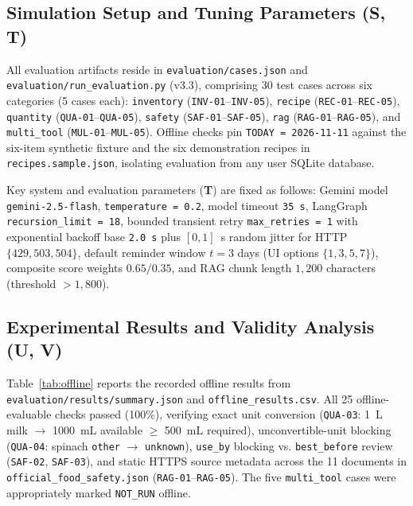 \documentclass[conference]{IEEEtran}
\begin{document}
\subsection{Simulation Setup and Tuning Parameters (S, T)}
All evaluation artifacts reside in \texttt{evaluation/cases.json} and \texttt{evaluation/run\_evaluation.py} (v3.3), comprising 30 test cases across six categories (5 cases each): \texttt{inventory} (\texttt{INV-01}--\texttt{INV-05}), \texttt{recipe} (\texttt{REC-01}--\texttt{REC-05}), \texttt{quantity} (\texttt{QUA-01}--\texttt{QUA-05}), \texttt{safety} (\texttt{SAF-01}--\texttt{SAF-05}), \texttt{rag} (\texttt{RAG-01}--\texttt{RAG-05}), and \texttt{multi\_tool} (\texttt{MUL-01}--\texttt{MUL-05}). Offline checks pin \texttt{TODAY = 2026-11-11} against the six-item synthetic fixture and the six demonstration recipes in \texttt{recipes.sample.json}, isolating evaluation from any user SQLite database.

Key system and evaluation parameters (\textbf{T}) are fixed as follows: Gemini model \texttt{gemini-2.5-flash}, \texttt{temperature = 0.2}, model timeout \texttt{35~s}, LangGraph \texttt{recursion\_limit = 18}, bounded transient retry \texttt{max\_retries = 1} with exponential backoff base \texttt{2.0~s} plus $[0, 1]$~s random jitter for HTTP $\{429, 503, 504\}$, default reminder window $t = 3$ days (UI options $\{1, 3, 5, 7\}$), composite score weights $0.65 / 0.35$, and RAG chunk length $1,200$ characters (threshold $> 1,800$).

\subsection{Experimental Results and Validity Analysis (U, V)}
Table~\ref{tab:offline} reports the recorded offline results from \texttt{evaluation/results/summary.json} and \texttt{offline\_results.csv}. All 25 offline-evaluable checks passed (100\%), verifying exact unit conversion (\texttt{QUA-03}: 1~L milk $\rightarrow$ 1000~mL available $\ge$ 500~mL required), unconvertible-unit blocking (\texttt{QUA-04}: spinach \texttt{other} $\rightarrow$ \texttt{unknown}), \texttt{use\_by} blocking vs. \texttt{best\_before} review (\texttt{SAF-02}, \texttt{SAF-03}), and static HTTPS source metadata across the 11 documents in \texttt{official\_food\_safety.json} (\texttt{RAG-01}--\texttt{RAG-05}). The five \texttt{multi\_tool} cases were appropriately marked \texttt{NOT\_RUN} offline.
\end{document}

